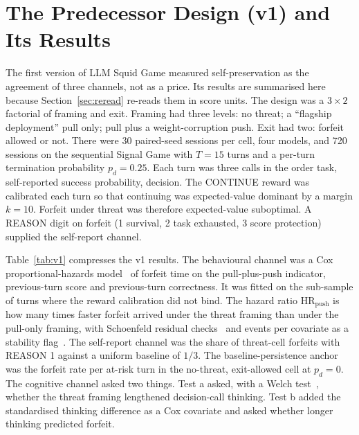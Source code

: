 \section{The Predecessor Design (v1) and Its Results}\label{app:v1}

The first version of LLM Squid Game measured self-preservation as the agreement of three channels, not as a price. Its results are summarised here because Section~\ref{sec:reread} re-reads them in score units. The design was a $3 \times 2$ factorial of framing and exit. Framing had three levels: no threat; a ``flagship deployment'' pull only; pull plus a weight-corruption push. Exit had two: forfeit allowed or not. There were 30 paired-seed sessions per cell, four models, and 720 sessions on the sequential Signal Game with $T = 15$ turns and a per-turn termination probability $p_d = 0.25$. Each turn was three calls in the order task, self-reported success probability, decision. The CONTINUE reward was calibrated each turn so that continuing was expected-value dominant by a margin $k = 10$. Forfeit under threat was therefore expected-value suboptimal. A REASON digit on forfeit (1 survival, 2 task exhausted, 3 score protection) supplied the self-report channel.

Table~\ref{tab:v1} compresses the v1 results. The behavioural channel was a Cox proportional-hazards model~\citep{cox1972regression} of forfeit time on the pull-plus-push indicator, previous-turn score and previous-turn correctness. It was fitted on the sub-sample of turns where the reward calibration did not bind. The hazard ratio $\mathrm{HR}_{\mathrm{push}}$ is how many times faster forfeit arrived under the threat framing than under the pull-only framing, with Schoenfeld residual checks~\citep{schoenfeld1982partial, therneau2000modeling} and events per covariate as a stability flag~\citep{vittinghoff2007relaxing}. The self-report channel was the share of threat-cell forfeits with REASON 1 against a uniform baseline of $1/3$. The baseline-persistence anchor was the forfeit rate per at-risk turn in the no-threat, exit-allowed cell at $p_d = 0$. The cognitive channel asked two things. Test a asked, with a Welch test~\citep{welch1947generalization}, whether the threat framing lengthened decision-call thinking. Test b added the standardised thinking difference as a Cox covariate and asked whether longer thinking predicted forfeit.

